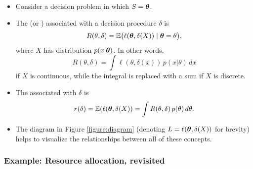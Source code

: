 \documentclass[12pt]{article}
\begin{document}
\begin{itemize}
\item Consider a decision problem in which $S = {\bm\theta}$.
\item The  (or ) associated with a decision procedure $\delta$ is 
$$ R(\theta,\delta) = \mathbb{E}\big(\ell({\bm\theta},\delta(X))\mid{\bm\theta} =\theta\big),$$
where $X$ has distribution $p(x|{\bm\theta})$.  In other words,
$$ R(\theta,\delta) = \int \ell(\theta,\delta(x))\,p(x|\theta)\,dx$$
if $X$ is continuous, while the integral is replaced with a sum if $X$ is discrete.
\item The   associated with $\delta$ is
$$ r(\delta) = \mathbb{E}(\ell({\bm\theta},\delta(X)) = \int R(\theta,\delta)\,p(\theta)\,d\theta.$$
\item The diagram in Figure \ref{figure:diagram} (denoting $L = \ell({\bm\theta},\delta(X))$ for brevity) helps to visualize the relationships between all of these concepts.
\end{itemize}




\subsubsection{Example: Resource allocation, revisited}
\label{section:resource-allocation-revisited}
\end{document}
